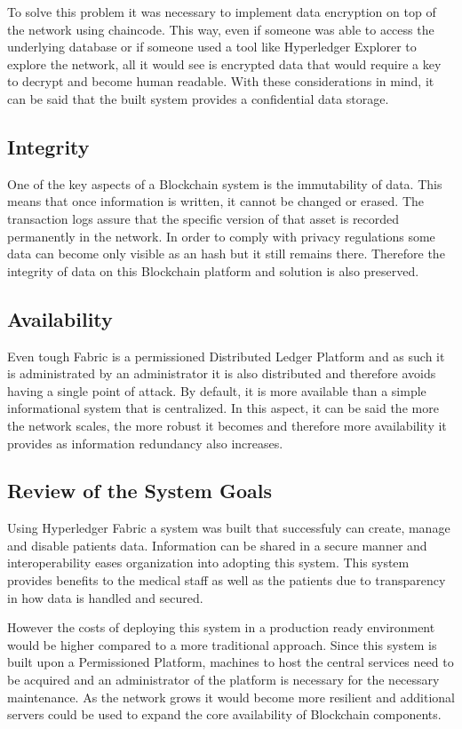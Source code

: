 To solve this problem it was necessary to implement data encryption on top of
the network using chaincode. This way, even if someone was able to access the
underlying database or if someone used a tool like Hyperledger Explorer to
explore the network, all it would see is encrypted data that would require a
key to decrypt and become human readable. With these considerations in mind, it
can be said that the built system provides a confidential data storage.

\subsection{Integrity}

One of the key aspects of a Blockchain system is the immutability of data. This
means that once information is written, it cannot be changed or erased. The
transaction logs assure that the specific version of that asset is recorded
permanently in the network. In order to comply with privacy regulations some
data can become only visible as an hash but it still remains there. Therefore
the integrity of data on this Blockchain platform and solution is also
preserved.

\subsection{Availability}

Even tough Fabric is a permissioned Distributed Ledger Platform and as such it
is administrated by an administrator it is also distributed and therefore
avoids having a single point of attack. By default, it is more available than a
simple informational system that is centralized. In this aspect, it can be said
the more the network scales, the more robust it becomes and therefore more
availability it provides as information redundancy also increases.

\subsection{Review of the System Goals}

Using Hyperledger Fabric a system was built that successfuly can create, manage
and disable patients data. Information can be shared in a secure manner and
interoperability eases organization into adopting this system. This system
provides benefits to the medical staff as well as the patients due to
transparency in how data is handled and secured.

However the costs of deploying this system in a production ready environment
would be higher compared to a more traditional approach. Since this system is
built upon a Permissioned Platform, machines to host the central services need
to be acquired and an administrator of the platform is necessary for the
necessary maintenance. As the network grows it would become more resilient and
additional servers could be used to expand the core availability of Blockchain
components.

